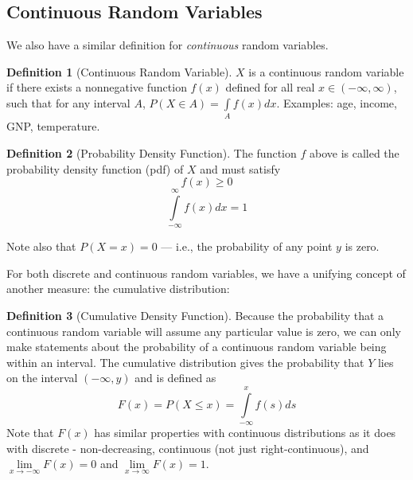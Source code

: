 \documentclass[
]{book}
\theoremstyle{definition}
\newtheorem{definition}{Definition}[chapter]
\theoremstyle{definition}
\theoremstyle{definition}
\theoremstyle{definition}
\theoremstyle{remark}
\begin{document}
\hypertarget{continuous-random-variables}{%
\subsection*{Continuous Random Variables}\label{continuous-random-variables}}

We also have a similar definition for \emph{continuous} random variables.

\begin{definition}[Continuous Random Variable]
\protect\hypertarget{def:unnamed-chunk-265}{}{\label{def:unnamed-chunk-265} {} }
\(X\) is a continuous random variable if there exists a nonnegative function \(f(x)\) defined for all real \(x\in (-\infty,\infty)\), such that for any interval \(A\), \(P(X\in A)=\int\limits_A f(x)dx\). Examples: age, income, GNP, temperature.
\end{definition}

\begin{definition}[Probability Density Function]
\protect\hypertarget{def:unnamed-chunk-266}{}{\label{def:unnamed-chunk-266} {} }
The function \(f\) above is called the probability density function (pdf) of \(X\) and must satisfy
\[f(x)\ge 0\]
\[\int\limits_{-\infty}^\infty f(x)dx=1\]

Note also that \(P(X = x)=0\) --- i.e., the probability of any point \(y\) is zero.
\end{definition}

For both discrete and continuous random variables, we have a unifying concept of another measure: the cumulative distribution:

\begin{definition}[Cumulative Density Function]
\protect\hypertarget{def:unnamed-chunk-267}{}{\label{def:unnamed-chunk-267} {} }Because the probability that a continuous random variable will assume any particular value is zero, we can only make statements about the probability of a continuous random variable being within an interval. The cumulative distribution gives the probability that \(Y\) lies on the interval \((-\infty,y)\) and is defined as \[F(x)=P(X\le x)=\int\limits_{-\infty}^x f(s)ds\] Note that \(F(x)\) has similar properties with continuous distributions as it does with discrete - non-decreasing, continuous (not just right-continuous), and \(\lim\limits_{x \to -\infty} F(x) = 0\) and \(\lim\limits_{x \to \infty} F(x) = 1\).
\end{definition}
\end{document}
